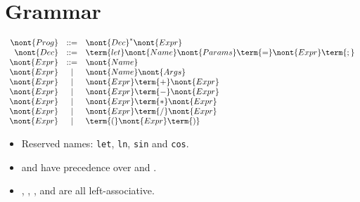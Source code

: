 \section{Grammar}

\label{section:grammar}

\[\begin{array}{rclr}
\nont{Prog}   &::=& \nont{Dec}^* \nont{Expr} \\
\nont{Dec}    &::=& \term{let} \nont{Name} \nont{Params}
                    \term{=} \nont{Expr} \term{;} \\
\nont{Expr}   &::=& \nont{Name} \\
\nont{Expr}   & | & \nont{Name} \nont{Args} \\
\nont{Expr}   & | & \nont{Expr} \term{+} \nont{Expr} \\
\nont{Expr}   & | & \nont{Expr} \term{-} \nont{Expr} \\
\nont{Expr}   & | & \nont{Expr} \term{*} \nont{Expr} \\
\nont{Expr}   & | & \nont{Expr} \term{/} \nont{Expr} \\
\nont{Expr}   & | & \term{(} \nont{Expr} \term{)} \\
\end{array}\]

\begin{itemize}

\item Reserved names: \texttt{let}, \texttt{ln}, \texttt{sin} and
\texttt{cos}.

\item \term{*} and \term{/} have precedence over \term{+} and \term{-}.

\item \term{+}, \term{-}, \term{*}, and \term{/} are all left-associative.

\end{itemize}
